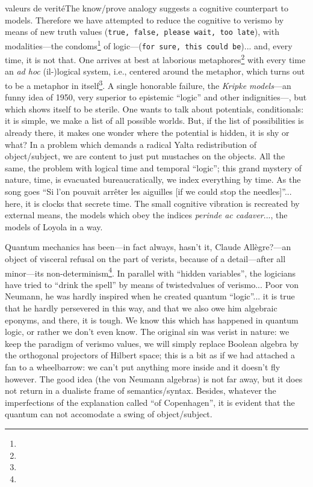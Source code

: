 \documentclass{article}
\begin{document}
valeurs de veritéThe know/prove analogy suggests a cognitive counterpart to models. Therefore we have attempted to reduce the cognitive to verismo by means of new truth values (\texttt{true, false, please wait, too late}), with modalities---the condoms\footnote{} of logic---(\texttt{for sure, this could be})... and, every time, it is not that. One arrives at best at laborious metaphores\footnote{} with every time an \emph{ad hoc} (il-)logical system, i.e., centered around the metaphor, which turns out to be a metaphor in itself\footnote{}. A single honorable failure, the \emph{Kripke models}---an funny idea of 1950, very superior to epistemic \enquote{logic} and other indignities---, but which shows itself to be sterile. One wants to talk about potentials, conditionals: it is simple, we make a list of all possible worlds. But, if the list of possibilities is already there, it makes one wonder where the potential is hidden, it is shy or what? In a problem which demands a radical Yalta redistribution of object/subject, we are content to just put mustaches on the objects. All the same, the problem with logical time and temporal \enquote{logic}; this grand mystery of nature, time, is evacuated bureaucratically, we index everything by time. As the song goes \enquote{Si l'on pouvait arrêter les aiguilles [if we could stop the needles]}... here, it is clocks that secrete time. The small cognitive vibration is recreated by external means, the models which obey the indices \emph{perinde ac cadaver}..., the models of Loyola in a way.

Quantum mechanics has been---in fact always, hasn't it, Claude Allègre?---an object of visceral refusal on the part of verists, because of a detail---after all minor---its non-determinism\footnote{}. In parallel with \enquote{hidden variables}, the logicians have tried to \enquote{drink the spell} by means of twistedvalues of verismo... Poor von Neumann, he was hardly inspired when he created quantum \enquote{logic}... it is true that he hardly persevered in this way, and that we also owe him algebraic eponyms, and there, it is tough. We know this which has happened in quantum logic, or rather we don't even know. The original sin was verist in nature: we keep the paradigm of verismo values, we will simply replace Boolean algebra by the orthogonal projectors of Hilbert space; this is a bit as if we had attached a fan to a wheelbarrow: we can't put anything more inside and it doesn't fly however. The good idea (the von Neumann algebras) is not far away, but it does not return in a dualiste frame of semantics/syntax. Besides, whatever the imperfections of the explanation called \enquote{of Copenhagen}, it is evident that the quantum can not accomodate a swing of object/subject.
\end{document}
